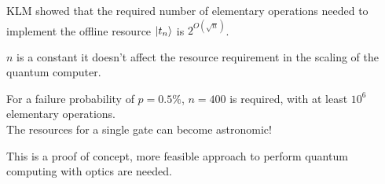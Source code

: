 \documentclass{beamer}
\begin{document}
\begin{frame}
\begin{center}

KLM showed that the required number of elementary operations needed to implement the offline resource $\ket{t_n}$ is $2^{O \left( \sqrt{n} \right)}$.
\begin{block}{}
\begin{center}
$n$ is a constant it doesn't affect the resource requirement in the scaling of the quantum computer.
\end{center}
\end{block}
For a failure probability of $p = 0.5 \%$, $n = 400$ is required, with at least $10^6$ elementary operations.\\
\vspace{10pt}
The resources for a single gate can become astronomic!

\begin{block}{}
\begin{center}
This is a proof of concept, more feasible approach to perform quantum computing with optics are needed.
\end{center}
\end{block}{}

\end{center}
\end{frame}

\end{document}
